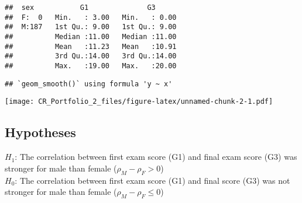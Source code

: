\documentclass[
]{article}
\newenvironment{Shaded}{\begin{snugshade}}{\end{snugshade}}
\newcommand{\DataTypeTok}[1]{\textcolor[rgb]{0.13,0.29,0.53}{#1}}
\newcommand{\KeywordTok}[1]{\textcolor[rgb]{0.13,0.29,0.53}{\textbf{#1}}}
\newcommand{\NormalTok}[1]{#1}
\newcommand{\OperatorTok}[1]{\textcolor[rgb]{0.81,0.36,0.00}{\textbf{#1}}}
\newcommand{\OtherTok}[1]{\textcolor[rgb]{0.56,0.35,0.01}{#1}}
\newcommand{\StringTok}[1]{\textcolor[rgb]{0.31,0.60,0.02}{#1}}
\begin{document}
\begin{verbatim}
##  sex           G1              G3       
##  F:  0   Min.   : 3.00   Min.   : 0.00  
##  M:187   1st Qu.: 9.00   1st Qu.: 9.00  
##          Median :11.00   Median :11.00  
##          Mean   :11.23   Mean   :10.91  
##          3rd Qu.:14.00   3rd Qu.:14.00  
##          Max.   :19.00   Max.   :20.00
\end{verbatim}

\begin{Shaded}
\end{Shaded}

\begin{verbatim}
## `geom_smooth()` using formula 'y ~ x'
\end{verbatim}

\texttt{[image: CR\_Portfolio\_2\_files/figure-latex/unnamed-chunk-2-1.pdf]}

\hypertarget{hypotheses}{%
\subsection{Hypotheses}\label{hypotheses}}

\(H_{1}\): The correlation between first exam score (G1) and final exam
score (G3) was stronger for male than female
(\(\rho_{M} - \rho_{F} > 0\))\\
\(H_{0}\): The correlation between first exam score (G1) and final score
(G3) was not stronger for male than female
(\(\rho_{M} - \rho_{F} \le 0\))\\
\end{document}
